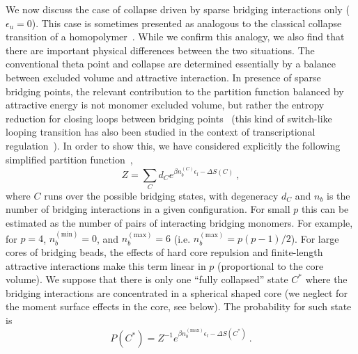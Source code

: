 \documentclass[
preprint,
a4paper,
12pt,
superscriptaddress,
pre]{revtex4}
\begin{document}
%

We now discuss the case of collapse driven by sparse bridging
interactions only ($\epsilon_u = 0$). This case is sometimes presented
as analogous to the classical collapse transition of a
homopolymer~\cite{Barbieri2013a}. While we confirm this analogy, we
also find that there are important physical differences between the
two situations. The conventional theta point and collapse are
determined essentially by a balance between excluded volume and
attractive interaction. In presence of sparse bridging points, the
relevant contribution to the partition function balanced by attractive
energy is not monomer excluded volume, but rather the entropy
reduction for closing loops between bridging
points~\cite{Marenduzzo2006c} (this kind of switch-like looping
transition has also been studied in the context of transcriptional
regulation~\cite{Saiz2006a}). In order to show this, we have
considered explicitly the following simplified partition
function~\cite{Marenduzzo2006c,Saiz2006a},
\begin{equation}
  \label{eq:Zloop}
  Z = \sum_{C} d_C e^{\beta n_b^{(C)} \epsilon_l - \Delta S(C)} \ ,
\end{equation}
where $C$ runs over the possible bridging states, with degeneracy
$d_C$
and $n_b$ is the number of bridging interactions in a given
configuration.  For small $p$ this can be estimated as the number of
pairs of interacting bridging monomers. For example, for $p=4$,
$n_b^{\mathrm{(min)}}=0$, and $n_b^{\mathrm{(max)}}=6$
(i.e. $n_b^{\mathrm{(max)}}=p(p-1)/2$).  For large cores of bridging
beads, the effects of hard core repulsion and finite-length attractive
interactions make this term linear in $p$ (proportional to the core
volume).
%
We suppose that there is only one ``fully collapsed'' state $C^*$
where the bridging interactions are concentrated in a spherical shaped
core (we neglect for the moment surface effects in the core, see
below). The probability for such state is
\begin{equation}
  \label{eq:prob_collapseZ}
  P(C^*) = Z^{-1}  e^{\beta n_b^{\mathrm{(max)}} \epsilon_l - \Delta
    S(C^*)} \ .
\end{equation}
\end{document}
